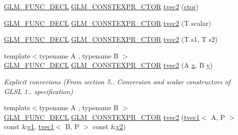 \begin{DoxyCompactItemize}
\item 
\mbox{\hyperlink{setup_8hpp_ab2d052de21a70539923e9bcbf6e83a51}{G\+L\+M\+\_\+\+F\+U\+N\+C\+\_\+\+D\+E\+CL}} \mbox{\hyperlink{setup_8hpp_ad34178a09666081abdb573c14d1f4a5a}{G\+L\+M\+\_\+\+C\+O\+N\+S\+T\+E\+X\+P\+R\+\_\+\+C\+T\+OR}} \mbox{\hyperlink{structglm_1_1tvec2_a8874fb6a6421887e236bd3fae0fb44b2}{tvec2}} (\mbox{\hyperlink{namespaceglm_a807df837905ec286f806a536af03b57f}{ctor}})
\item 
\mbox{\hyperlink{setup_8hpp_ab2d052de21a70539923e9bcbf6e83a51}{G\+L\+M\+\_\+\+F\+U\+N\+C\+\_\+\+D\+E\+CL}} \mbox{\hyperlink{setup_8hpp_ad34178a09666081abdb573c14d1f4a5a}{G\+L\+M\+\_\+\+C\+O\+N\+S\+T\+E\+X\+P\+R\+\_\+\+C\+T\+OR}} \mbox{\hyperlink{structglm_1_1tvec2_afa741b140588f0be3ceb59ec2b139e34}{tvec2}} (T scalar)
\item 
\mbox{\hyperlink{setup_8hpp_ab2d052de21a70539923e9bcbf6e83a51}{G\+L\+M\+\_\+\+F\+U\+N\+C\+\_\+\+D\+E\+CL}} \mbox{\hyperlink{setup_8hpp_ad34178a09666081abdb573c14d1f4a5a}{G\+L\+M\+\_\+\+C\+O\+N\+S\+T\+E\+X\+P\+R\+\_\+\+C\+T\+OR}} \mbox{\hyperlink{structglm_1_1tvec2_ab4da814e5111a69db7c57f3727fc52bb}{tvec2}} (T s1, T s2)
\item 
{\footnotesize template$<$typename A , typename B $>$ }\\\mbox{\hyperlink{setup_8hpp_ab2d052de21a70539923e9bcbf6e83a51}{G\+L\+M\+\_\+\+F\+U\+N\+C\+\_\+\+D\+E\+CL}} \mbox{\hyperlink{setup_8hpp_ad34178a09666081abdb573c14d1f4a5a}{G\+L\+M\+\_\+\+C\+O\+N\+S\+T\+E\+X\+P\+R\+\_\+\+C\+T\+OR}} \mbox{\hyperlink{structglm_1_1tvec2_ad528be53a77734a77e01ffe80c71d42e}{tvec2}} (A \mbox{\hyperlink{glad_8h_a92d0386e5c19fb81ea88c9f99644ab1d}{x}}, B \mbox{\hyperlink{glad_8h_a66ddd433d2cacfe27f5906b7e86faeed}{y}})
\begin{DoxyCompactList}\small\item\em Explicit converions (From section 5.. Conversion and scalar constructors of G\+L\+SL 1.. specification) \end{DoxyCompactList}\item 
{\footnotesize template$<$typename A , typename B $>$ }\\\mbox{\hyperlink{setup_8hpp_ab2d052de21a70539923e9bcbf6e83a51}{G\+L\+M\+\_\+\+F\+U\+N\+C\+\_\+\+D\+E\+CL}} \mbox{\hyperlink{setup_8hpp_ad34178a09666081abdb573c14d1f4a5a}{G\+L\+M\+\_\+\+C\+O\+N\+S\+T\+E\+X\+P\+R\+\_\+\+C\+T\+OR}} \mbox{\hyperlink{structglm_1_1tvec2_a6284a7d6b9a31303f992b42894d47db7}{tvec2}} (\mbox{\hyperlink{structglm_1_1tvec1}{tvec1}}$<$ A, P $>$ const \&\mbox{\hyperlink{glad_8h_a0779c3b73f9aa3a0ac5b0139b5d291d9}{v1}}, \mbox{\hyperlink{structglm_1_1tvec1}{tvec1}}$<$ B, P $>$ const \&\mbox{\hyperlink{glad_8h_a9a09a1837922b2b806f4589096a52049}{v2}})

\end{DoxyCompactItemize}
